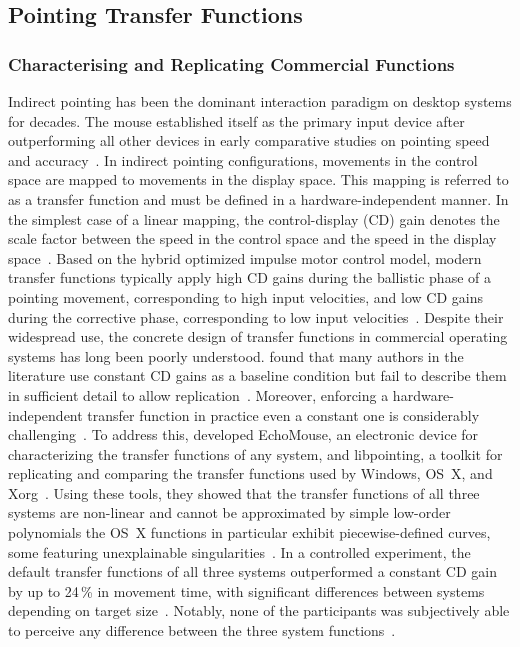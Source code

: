 \documentclass[12pt,a4paper]{report}
\begin{document}
        \subsection{Pointing Transfer Functions}

        \subsubsection{Characterising and Replicating Commercial Functions}

        Indirect pointing has been the dominant interaction paradigm on desktop systems for decades. The mouse established itself as the primary input device after outperforming all other devices in early comparative studies on pointing speed and accuracy~\cite{casiez2011no}. In indirect pointing configurations, movements in the control space are mapped to movements in the display space. This mapping is referred to as a transfer function and must be defined in a hardware-independent manner. In the simplest case of a linear mapping, the control-display (CD) gain denotes the scale factor between the speed in the control space and the speed in the display space~\cite{casiez2011no}. Based on the hybrid optimized impulse motor control model, modern transfer functions typically apply high CD gains during the ballistic phase of a pointing movement, corresponding to high input velocities, and low CD gains during the corrective phase, corresponding to low input velocities~\cite{eddy2026tftune}. Despite their widespread use, the concrete design of transfer functions in commercial operating systems has long been poorly understood. \citeauthor{casiez2011no} found that many authors in the literature use constant CD gains as a baseline condition but fail to describe them in sufficient detail to allow replication~\cite{casiez2011no}. Moreover, enforcing a hardware-independent transfer function in practice even a constant one is considerably challenging~\cite{casiez2011no}. To address this, \citeauthor{casiez2011no} developed EchoMouse, an electronic device for characterizing the transfer functions of any system, and libpointing, a toolkit for replicating and comparing the transfer functions used by Windows, OS~X, and Xorg~\cite{casiez2011no}. Using these tools, they showed that the transfer functions of all three systems are non-linear and cannot be approximated by simple low-order polynomials the OS~X functions in particular exhibit piecewise-defined curves, some featuring unexplainable singularities~\cite{casiez2011no}. In a controlled experiment, the default transfer functions of all three systems outperformed a constant CD gain by up to 24\,\% in movement time, with significant differences between systems depending on target size~\cite{casiez2011no}. Notably, none of the participants was subjectively able to perceive any difference between the three system functions~\cite{casiez2011no}.
\end{document}
